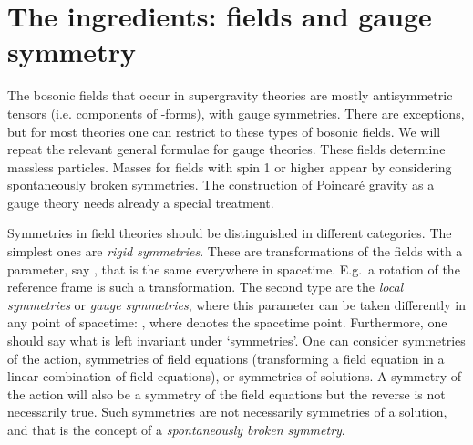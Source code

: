 \documentclass[a4paper,11pt,twoside]{article}
\begin{document}
\section{The ingredients: fields and gauge symmetry} \label{ss:bosIngred}

The bosonic fields that occur in supergravity theories are mostly
antisymmetric tensors (i.e. components of \coordHE{}-forms), with gauge
symmetries. There are exceptions, but for most theories one can restrict
to these types of bosonic fields. We will repeat the relevant general
formulae for gauge theories. These fields determine massless particles.
Masses for fields with spin 1 or higher appear by considering
spontaneously broken symmetries. The construction of Poincar{\'e} gravity as
a gauge theory needs already a special treatment.

Symmetries in field theories should be distinguished in different
categories. The simplest ones are \emph{rigid symmetries}. These are
transformations of the fields with a parameter, say \myHighlight{$\Lambda $}\coordHE{}, that is
the same everywhere in spacetime. E.g.\ a rotation of the reference frame
is such a transformation. The second type are the \emph{local symmetries}
or \emph{gauge symmetries}, where this parameter can be taken differently
in any point of spacetime: \coordHE{}, where \coordHE{} denotes the spacetime
point. Furthermore, one should say what is left invariant under
`symmetries'. One can consider symmetries of the action, symmetries of
field equations (transforming a field equation in a linear combination of
field equations), or symmetries of solutions. A symmetry of the action
will also be a symmetry of the field equations but the reverse is not
necessarily true. Such symmetries are not necessarily symmetries of a
solution, and that is the concept of a \emph{spontaneously broken
symmetry}.
\end{document}
